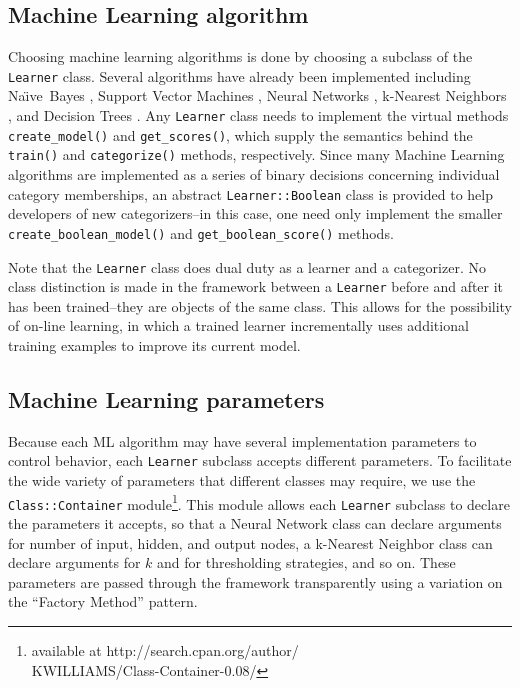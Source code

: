 \documentclass[twocolumn]{article}
\newcommand{\naive}{Na\"\i ve}
\newcommand{\method}[1]{\texttt{#1()}}
\newcommand{\class}[1]{\texttt{#1}}
\begin{document}
\subsection*{Machine Learning algorithm}
Choosing machine learning algorithms is done
by choosing a subclass of the \class{Learner} class.  Several
algorithms have already been implemented including \naive\ Bayes
\cite{lewis:98}, Support Vector Machines \cite{scholkopf:99}
\cite{cortes:95}, Neural Networks \cite{calvo:01} \cite{yang:99},
k-Nearest Neighbors \cite{yang:99}, and Decision Trees
\cite{quinlan:89}.  Any \class{Learner} class needs to implement the
virtual methods \method{create\_model} and \method{get\_scores},
which supply the semantics behind the \method{train} and
\method{categorize} methods, respectively.  Since many Machine
Learning algorithms are implemented as a series of binary decisions
concerning individual category memberships, an abstract
\class{Learner::Boolean} class is provided to help developers of new
categorizers--in this case, one need only implement the smaller
\method{create\_boolean\_model} and \method{get\_boolean\_score}
methods.

Note that the \class{Learner} class does dual duty as a learner and a
categorizer.  No class distinction is made in the framework between a
\class{Learner} before and after it has been trained--they are
objects of the same class.  This allows for the possibility of on-line
learning, in which a trained learner incrementally uses additional
training examples to improve its current model.

\subsection*{Machine Learning parameters}
Because each ML algorithm may have several implementation parameters
to control behavior, each \class{Learner} subclass accepts different
parameters.  To facilitate the wide variety of parameters that
different classes may require, we use the \class{Class::Container}
module\footnote{available at http://search.cpan.org/author/\\
KWILLIAMS/Class-Container-0.08/}.  This module allows each
\class{Learner} subclass to declare the parameters it accepts, so
that a Neural Network class can declare arguments for number of input,
hidden, and output nodes, a k-Nearest Neighbor class can declare
arguments for $k$ and for thresholding strategies, and so on.  These
parameters are passed through the framework transparently using a
variation on the ``Factory Method'' pattern. \cite{gamma:95}
\end{document}
